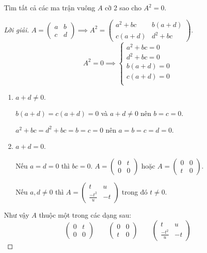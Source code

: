 \begin{exercise}
    Tìm tất cả các ma trận vuông $A$ cỡ 2 sao cho $A^{2} = 0$.
\end{exercise}

\begin{proof}[Lời giải]
    $A = \begin{pmatrix}a & b \\ c & d\end{pmatrix}\implies A^{2} = \begin{pmatrix}a^{2}+bc & b(a+d) \\ c(a+d) & d^{2}+bc\end{pmatrix}$.
    \[
        A^{2} = 0
        \implies
        \begin{cases}
            a^{2}+bc = 0 \\
            d^{2}+bc = 0 \\
            b(a + d) = 0 \\
            c(a + d) = 0 \\
        \end{cases}
    \]
    \begin{enumerate}[label={Trường hợp \arabic*:},itemindent=2cm]
        \item $a + d \ne 0$.
              
              $b(a+d) = c(a+d) = 0$ và $a+d\ne 0$ nên $b = c = 0$.
              
              $a^{2} + bc = d^{2} + bc = b = c = 0$ nên $a = b = c = d = 0$.
        \item $a + d = 0$.
              
              Nếu $a = d = 0$ thì $bc = 0$. $A = \begin{pmatrix}0 & t \\ 0 & 0\end{pmatrix}$ hoặc $A = \begin{pmatrix}0 & 0 \\ t & 0\end{pmatrix}$.
              
              Nếu $a, d\ne 0$ thì $A = \begin{pmatrix}t & u \\ \frac{-t^{2}}{u} & -t\end{pmatrix}$ trong đó $t \ne 0$.
    \end{enumerate}
    
    Như vậy $A$ thuộc một trong các dạng sau:
    \[
        \begin{pmatrix}
            0 & t \\
            0 & 0
        \end{pmatrix}
        \qquad
        \begin{pmatrix}
            0 & 0 \\
            t & 0
        \end{pmatrix}
        \qquad
        \begin{pmatrix}
            t                & u  \\
            \frac{-t^{2}}{u} & -t
        \end{pmatrix}
    \]
\end{proof}

